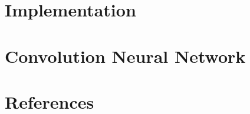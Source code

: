 % 

% 
% 
% 
% 

\section[Libs]{Implementation}
% 
% 
% 

\section[CNN]{Convolution Neural Network}



% 
% 

 
 
% 


 \section[Refs]{References}
 
